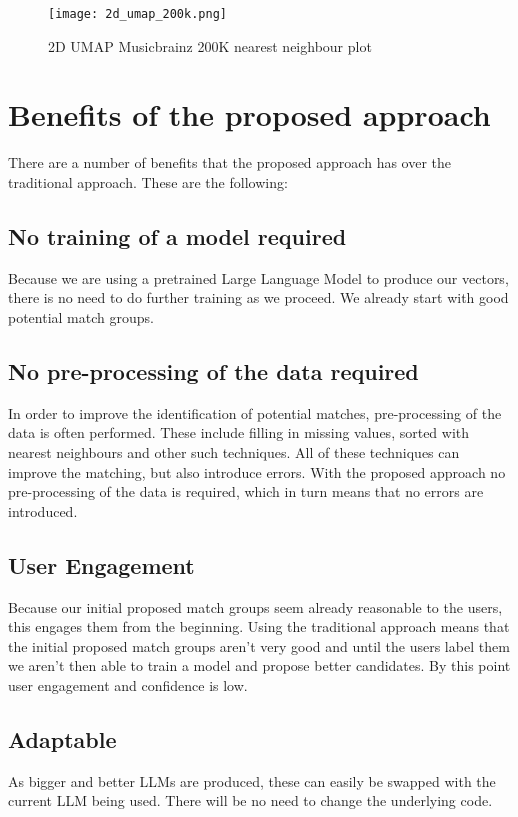 \documentclass{article}
\begin{document}
\begin{figure}[h]
\texttt{[image: 2d\_umap\_200k.png]}
\caption{2D UMAP Musicbrainz 200K nearest neighbour plot}
\label{fig:embedding2d}
\end{figure} %

\section{Benefits of the proposed approach}
There are a number of benefits that the proposed approach has over the traditional approach. These are the following:

\subsection{No training of a model required}
Because we are using a pretrained Large Language Model to produce our vectors, there is no need to do further training as we proceed. We already start with good potential match groups.

\subsection{No pre-processing of the data required}
In order to improve the identification of potential matches, pre-processing of the data is often performed. These include filling in missing values, sorted with nearest neighbours and other such techniques. All of these techniques can improve the matching, but also introduce errors. With the proposed approach no pre-processing of the data is required, which in turn means that no errors are introduced.

\subsection{User Engagement}
Because our initial proposed match groups seem already reasonable to the users, this engages them from the beginning. Using the traditional approach means that the initial proposed match groups aren't very good and until the users label them we aren't then able to train a model and propose better candidates. By this point user engagement and confidence is low.

\subsection{Adaptable}
As bigger and better LLMs are produced, these can easily be swapped with the current LLM being used. There will be no need to change the underlying code.
\end{document}
